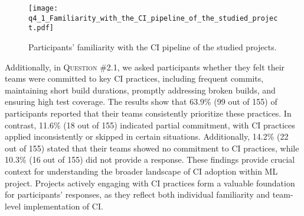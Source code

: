 \begin{figure}
	\centering
	\texttt{[image: q4\_1\_Familiarity\_with\_the\_CI\_pipeline\_of\_the\_studied\_project.pdf]}
	\caption{Participants' familiarity with the CI pipeline of the studied projects.}	\label{fig:q4_1_Familiarity_with_the_CI_pipeline_of_the_studied_project}       %
\end{figure}

Additionally, in \textsc{Question \#2.1}, we asked participants whether they felt their teams were committed to key CI practices, including frequent commits, maintaining short build durations, promptly addressing broken builds, and ensuring high test coverage. The results show that 63.9\% (99 out of 155) of participants reported that their teams consistently prioritize these practices. In contrast, 11.6\% (18 out of 155) indicated partial commitment, with CI practices applied inconsistently or skipped in certain situations. Additionally, 14.2\% (22 out of 155) stated that their teams showed no commitment to CI practices, while 10.3\% (16 out of 155) did not provide a response.
These findings provide crucial context for understanding the broader landscape of CI adoption within ML project. Projects actively engaging with CI practices form a valuable foundation for participants’ responses, as they reflect both individual familiarity and team-level implementation of CI. 


